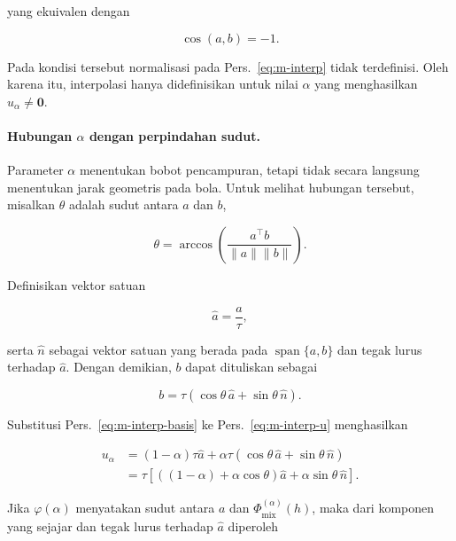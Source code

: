 yang ekuivalen dengan

\begin{equation}
\cos(a,b)=-1.
\end{equation}

Pada kondisi tersebut normalisasi pada Pers.~\eqref{eq:m-interp} tidak
terdefinisi. Oleh karena itu, interpolasi hanya didefinisikan untuk nilai
$\alpha$ yang menghasilkan $u_\alpha\neq\mathbf{0}$.

\paragraph{Hubungan $\alpha$ dengan perpindahan sudut.}

Parameter $\alpha$ menentukan bobot pencampuran, tetapi tidak secara langsung
menentukan jarak geometris pada bola. Untuk melihat hubungan tersebut,
misalkan $\theta$ adalah sudut antara $a$ dan $b$,

\begin{equation}
\theta
=
\arccos
\left(
\frac{a^\top b}
{\lVert a\rVert\lVert b\rVert}
\right).
\label{eq:m-interp-theta}
\end{equation}

Definisikan vektor satuan

\begin{equation}
\hat a=\frac{a}{\tau},
\end{equation}

serta $\hat n$ sebagai vektor satuan yang berada pada
$\operatorname{span}\{a,b\}$ dan tegak lurus terhadap $\hat a$. Dengan
demikian, $b$ dapat dituliskan sebagai

\begin{equation}
b
=
\tau
\left(
\cos\theta\,\hat a
+
\sin\theta\,\hat n
\right).
\label{eq:m-interp-basis}
\end{equation}

Substitusi Pers.~\eqref{eq:m-interp-basis} ke Pers.~\eqref{eq:m-interp-u}
menghasilkan

\begin{align}
u_\alpha
&=
(1-\alpha)\tau\hat a
+
\alpha\tau
\left(
\cos\theta\,\hat a
+
\sin\theta\,\hat n
\right)
\nonumber\\
&=
\tau
\left[
\left(
(1-\alpha)+\alpha\cos\theta
\right)\hat a
+
\alpha\sin\theta\,\hat n
\right].
\label{eq:m-interp-decomp}
\end{align}

Jika $\varphi(\alpha)$ menyatakan sudut antara $a$ dan
$\Phi_{\mathrm{mix}}^{(\alpha)}(h)$, maka dari komponen yang sejajar dan
tegak lurus terhadap $\hat a$ diperoleh

